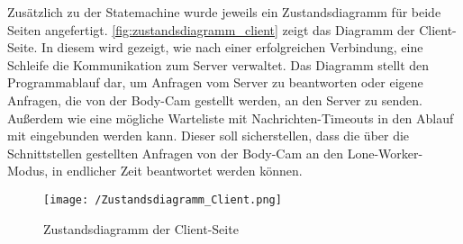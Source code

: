 \documentclass[thesis.tex]{subfiles}
\begin{document}
Zusätzlich zu der Statemachine wurde jeweils ein Zustandsdiagramm für beide Seiten angefertigt.
\autoref{fig:zustandsdiagramm_client} zeigt das Diagramm der Client-Seite.
In diesem wird gezeigt, wie nach einer erfolgreichen Verbindung, eine Schleife die Kommunikation zum Server verwaltet.
Das Diagramm stellt den Programmablauf dar, um Anfragen vom Server zu beantworten oder eigene Anfragen, die von der Body-Cam gestellt werden, an den Server zu senden.
Außerdem wie eine mögliche Warteliste mit Nachrichten-Timeouts in den Ablauf mit eingebunden werden kann.
Dieser soll sicherstellen, dass die über die Schnittstellen gestellten Anfragen von der Body-Cam an den Lone-Worker-Modus, in endlicher Zeit beantwortet werden können.

\begin{figure}[h]
    \centering
    \texttt{[image: /Zustandsdiagramm\_Client.png]}
    \caption{Zustandsdiagramm der Client-Seite}
    \label{fig:zustandsdiagramm_client}
\end{figure}

\subfilebib %
\end{document}
